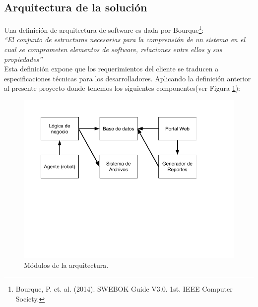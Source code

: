 \documentclass[letterpaper,11pt]{article}
\begin{document}
\subsection{Arquitectura de la solución}
Una definición de arquitectura de software es dada por Bourque\footnote{Bourque, P. et. al. (2014). SWEBOK Guide V3.0. 1st. IEEE Computer Society.}:\\
\textit{``El conjunto de estructuras necesarias para la comprensión de un sistema en el cual se comprometen elementos de software, relaciones entre ellos y sus propiedades''}\\
Esta definición expone que los requerimientos del cliente se traducen a especificaciones técnicas para los desarrolladores. Aplicando la definición anterior al presente proyecto donde tenemos los siguientes componentes(ver Figura \ref{fig:dia-arq-comp}):
\begin{figure}[h]
\centering
\includegraphics[scale=0.45]{dia-arq-comp} 
\caption{Módulos de la arquitectura.}
\label{fig:dia-arq-comp}
\end{figure}
\end{document}
